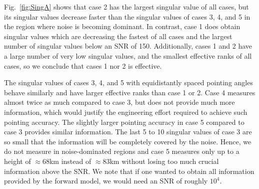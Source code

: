 Fig.~\ref{fig:SingA} shows that case 2 has the largest singular value of all cases, but its singular values decrease faster than the singular values of cases 3, 4, and 5 in the region where noise is becoming dominant.
In contrast, case 1 does obtain singular values which are decreasing the fastest of all cases and the largest number of singular values below an SNR of 150.
Additionally, cases 1 and 2 have a large number of very low singular values, and the smallest effective ranks of all cases, so we conclude that cases 1 nor 2 is effective.

The singular values of cases 3, 4, and 5 with equidistantly spaced pointing angles behave similarly and have larger effective ranks than case 1 or 2.
Case 4 measures almost twice as much compared to case 3, but does not provide much more information, which would justify the engineering effort required to achieve such pointing accuracy.
The slightly larger pointing accuracy in case 5 compared to case 3 provides similar information.
The last 5 to 10 singular values of case 3 are so small that the information will be completely covered by the noise.
Hence, we do not measure in noise-dominated regions and case 5 measures only up to a height of $\approx 68$km instead of $\approx83$km without losing too much crucial information above the SNR.
We note that if one wanted to obtain all information provided by the forward model, we would need an SNR of roughly $10^4$.
% 

